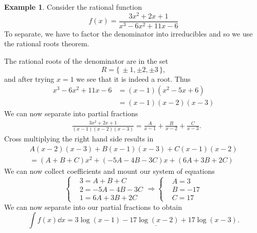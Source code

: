 \documentclass[12pt]{article}
\theoremstyle{plain}
\theoremstyle{definition}
\newtheorem{Ex}[Th]{Example}           %
\theoremstyle{remark}
\renewcommand{\:}{\colon}           %
\newcommand{\un}[1]{\underline{#1}}
\renewcommand{\.}{\Cdot}                %
\newcommand{\To}{\Rightarrow}
\newcommand{\set}[1]{\{\,#1\,\}}    %
\begin{document}
\begin{multicols}{2}
\begin{Ex}
Consider the rational function 
$$f(x)=\frac{3x^2+2x+1}{x^3-6x^2+11x-6}$$ 
To separate, we have to factor the denominator into irreducibles and so we use the rational roots theorem. \par
The rational roots of the denominator are in the set 
  $$R=\set{\pm 1,\pm 2,\pm 3},$$
  and after trying $x=1$ we see that it is indeed a root. Thus 
  \begin{align*}
    x^3-6x^2+11x-6&=(x-1)(x^2-5x+6)\\
    &=(x-1)(x-2)(x-3)
  \end{align*}
  We can now separate into partial fractions
  \begin{align*}
    &\frac{3x^2+2x+1}{(x-1)(x-2)(x-3)}=\frac{A}{x-1}+\frac{B}{x-2}+\frac{C}{x-3}.
  \end{align*}
  Cross multiplying the right hand side results in 
  \begin{gather*}
    A(x-2)(x-3)+B(x-1)(x-3)+C(x-1)(x-2)\\
    =(A+B+C)x^2+(-5A-4B-3C)x+(6A+3B+2C)
  \end{gather*}
  We can now collect coefficients and mount our system of equations 
  $$
\left\lbrace
\begin{aligned}
  &3=A+B+C\\
  &2=-5A-4B-3C\\
  &1=6A+3B+2C
\end{aligned}
\right.\To
\left\lbrace
\begin{aligned}
  &A=3\\
  &B=-17\\
  &C=17
\end{aligned}
\right.
$$
We can now separate into our partial fractions to obtain 
$$\int f(x)\dd x=\un{3\log(x-1)-17\log(x-2)+17\log(x-3)}.$$
\end{Ex}
\newpage

\end{multicols}
\end{document}
